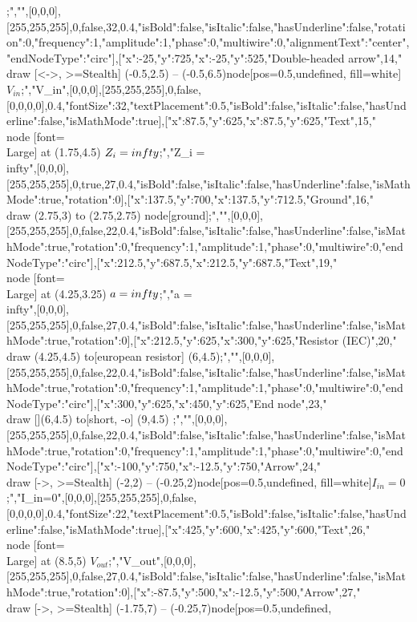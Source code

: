 ;","",[0,0,0],[255,255,255],0,false,32,0.4,{"isBold":false,"isItalic":false,"hasUnderline":false,"rotation":0,"frequency":1,"amplitude":1,"phase":0,"multiwire":0,"alignmentText":"center","endNodeType":"circ"}],[{"x":-25,"y":725},{"x":-25,"y":525},"Double-headed arrow",14,"\\draw [<->, >=Stealth] (-0.5,2.5) -- (-0.5,6.5)node[pos=0.5,undefined, fill=white]{$V_{in}$};","V_{in}",[0,0,0],[255,255,255],0,false,[0,0,0,0],0.4,{"fontSize":32,"textPlacement":0.5,"isBold":false,"isItalic":false,"hasUnderline":false,"isMathMode":true}],[{"x":87.5,"y":625},{"x":87.5,"y":625},"Text",15,"\\node [font=\\Large] at (1.75,4.5) {$Z_i = \\infty$};","Z_i = \\infty",[0,0,0],[255,255,255],0,true,27,0.4,{"isBold":false,"isItalic":false,"hasUnderline":false,"isMathMode":true,"rotation":0}],[{"x":137.5,"y":700},{"x":137.5,"y":712.5},"Ground",16,"\\draw (2.75,3) to (2.75,2.75) node[ground]{};","",[0,0,0],[255,255,255],0,false,22,0.4,{"isBold":false,"isItalic":false,"hasUnderline":false,"isMathMode":true,"rotation":0,"frequency":1,"amplitude":1,"phase":0,"multiwire":0,"endNodeType":"circ"}],[{"x":212.5,"y":687.5},{"x":212.5,"y":687.5},"Text",19,"\\node [font=\\Large] at (4.25,3.25) {$a = \\infty$};","a = \\infty",[0,0,0],[255,255,255],0,false,27,0.4,{"isBold":false,"isItalic":false,"hasUnderline":false,"isMathMode":true,"rotation":0}],[{"x":212.5,"y":625},{"x":300,"y":625},"Resistor (IEC)",20,"\\draw (4.25,4.5) to[european resistor] (6,4.5);","",[0,0,0],[255,255,255],0,false,22,0.4,{"isBold":false,"isItalic":false,"hasUnderline":false,"isMathMode":true,"rotation":0,"frequency":1,"amplitude":1,"phase":0,"multiwire":0,"endNodeType":"circ"}],[{"x":300,"y":625},{"x":450,"y":625},"End node",23,"\\draw [](6,4.5) to[short, -o] (9,4.5) ;","",[0,0,0],[255,255,255],0,false,22,0.4,{"isBold":false,"isItalic":false,"hasUnderline":false,"isMathMode":true,"rotation":0,"frequency":1,"amplitude":1,"phase":0,"multiwire":0,"endNodeType":"circ"}],[{"x":-100,"y":750},{"x":-12.5,"y":750},"Arrow",24,"\\draw [->, >=Stealth] (-2,2) -- (-0.25,2)node[pos=0.5,undefined, fill=white]{$I_{in}=0$};","I_{in}=0",[0,0,0],[255,255,255],0,false,[0,0,0,0],0.4,{"fontSize":22,"textPlacement":0.5,"isBold":false,"isItalic":false,"hasUnderline":false,"isMathMode":true}],[{"x":425,"y":600},{"x":425,"y":600},"Text",26,"\\node [font=\\Large] at (8.5,5) {$V_{out}$};","V_{out}",[0,0,0],[255,255,255],0,false,27,0.4,{"isBold":false,"isItalic":false,"hasUnderline":false,"isMathMode":true,"rotation":0}],[{"x":-87.5,"y":500},{"x":-12.5,"y":500},"Arrow",27,"\\draw [->, >=Stealth] (-1.75,7) -- (-0.25,7)node[pos=0.5,undefined, 